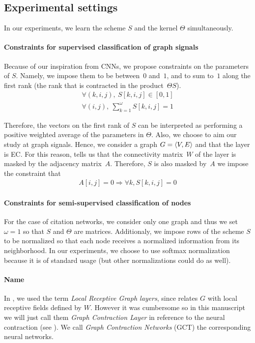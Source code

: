 \subsection{Experimental settings}
In our experiments, we learn the scheme $S$ and the kernel $\Theta$ simultaneously.

\paragraph{Constraints for supervised classification of graph signals}

Because of our inspiration from CNNs, we propose constraints on the parameters of $S$. Namely, we impose them to be between~$0$ and~$1$, and to sum to~$1$ along the first rank (the rank that is contracted in the product~$\Theta S$).
\begin{gather}
\forall (k,i,j),~S[k,i,j] \in [0,1]\\
\forall (i,j),~\displaystyle \sum_{k=1}^\omega S[k,i,j] = 1
\end{gather}

Therefore, the vectors on the first rank of $S$ can be interpreted as performing a positive weighted average of the parameters in $\Theta$.
Also, we choose to aim our study at graph signals. Hence, we consider a graph $G = \langle V, E \rangle$ and that the layer is EC. For this reason,  tells us that the connectivity matrix~$W$ of the layer is masked by the adjacency matrix~$A$. Therefore, $S$ is also masked by~$A$ \ie we impose the constraint that
\begin{gather}
A[i,j] = 0 \Rightarrow \forall k, S[k,i,j] = 0
\end{gather}

\paragraph{Constraints for semi-supervised classification of nodes}

For the case of citation networks, we consider only one graph and thus we set $\omega = 1$ so that $S$ and $\Theta$ are matrices. Additionaly, we impose rows of the scheme $S$ to be normalized so that each node receives a normalized information from its neighborhood. In our experiments, we choose to use softmax normalization because it is of standard usage (but other normalizations could do as well).

\paragraph{Name}
In \citep{vialatte2017learning}, we used the term \emph{Local Receptive Graph layers}, since  relates $G$ with local receptive fields defined by $W$. However it was cumbersome so in this manuscript we will just call them \emph{Graph Contraction Layer} in reference to the neural contraction (see ). We call \emph{Graph Contraction Networks} (GCT) the corresponding neural networks.

